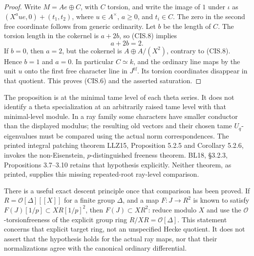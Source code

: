 \begin{proof}
Write \(M=Ae\oplus C\), with \(C\) torsion, and write the image
of \(1\) under \(\iota\) as
\((X^a u e,0)+(t_1,t_2)\), where \(u\in A^\times\),
\(a\geq0\), and \(t_i\in C\).  The zero in the second free
coordinate follows from generic ordinarity.  Let \(b\) be the
length of \(C\).  The torsion length in the cokernel is
\(a+2b\), so (CIS.8) implies
\[
                         a+2b=2.                    \tag{CIS.9}
\]
If \(b=0\), then \(a=2\), but the cokernel is
\(A\oplus A/(X^2)\), contrary to (CIS.8).  Hence \(b=1\) and
\(a=0\).  In particular \(C\simeq k\), and the ordinary line
maps by the unit \(u\) onto the first free character line in
\(J^{\mathrm{tf}}\).  Its torsion coordinates disappear in that
quotient.  This proves (CIS.6) and the asserted saturation.
\end{proof}

\begin{remark}
The proposition is at the minimal tame level of each theta series.
It does not identify a theta specialization at an arbitrarily
raised tame level with that minimal-level module.  In a ray family
some characters have smaller conductor than the displayed modulus;
the resulting old vectors and their chosen tame \(U_q\)-eigenvalues
must be compared using the actual norm correspondences.
The printed integral patching theorem LLZ15, Proposition 5.2.5 and
Corollary 5.2.6, invokes the non-Eisenstein, \(p\)-distinguished
freeness theorem.  BL18, \S3.2.3, Propositions 3.7--3.10 retains
that hypothesis explicitly.  Neither theorem, as printed, supplies
this missing repeated-root ray-level comparison.

There is a useful exact descent principle once that comparison has
been proved.  If \(R=\mathcal O[\Delta][[X]]\) for a finite group
\(\Delta\), and a map \(F:J\to R^2\) is known to satisfy
\(F(J)[1/p]\subset XR[1/p]^2\), then
\(F(J)\subset XR^2\): reduce modulo \(X\) and use the
\(\mathcal O\)-torsionfreeness of the explicit group ring
\(R/XR=\mathcal O[\Delta]\).  This statement concerns that explicit
target ring, not an unspecified Hecke quotient.  It does not assert
that the hypothesis holds for the actual ray maps, nor that their
normalizations agree with the canonical ordinary differential.
\end{remark}
